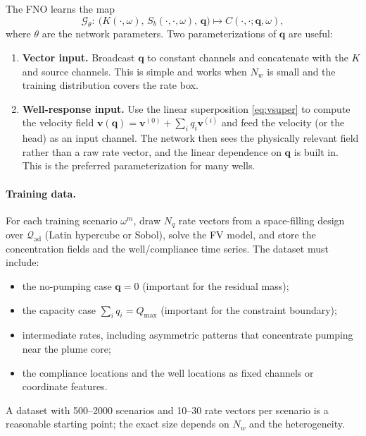 \documentclass[11pt]{article}
\numberwithin{equation}{section}
\newcommand{\vv}{\mathbf{v}}
\theoremstyle{plain}
\begin{document}
The FNO learns the map
\begin{equation}
\label{eq:fno}
\mathcal{G}_\theta:\
\bigl(K(\cdot,\omega),\,S_b(\cdot,\cdot,\omega),\,\mathbf{q}\bigr)
\longmapsto C(\cdot,\cdot;\mathbf{q},\omega),
\end{equation}
where $\theta$ are the network parameters.  Two parameterizations of
$\mathbf{q}$ are useful:
\begin{enumerate}[leftmargin=1.6em,itemsep=2pt]
  \item \textbf{Vector input.}  Broadcast $\mathbf{q}$ to constant channels
        and concatenate with the $K$ and source channels.  This is simple and
        works when $N_w$ is small and the training distribution covers the
        rate box.
  \item \textbf{Well-response input.}  Use the linear superposition
        \eqref{eq:vsuper} to compute the velocity field
        $\vv(\mathbf{q})=\vv^{(0)}+\sum_i q_i\vv^{(i)}$ and feed the velocity
        (or the head) as an input channel.  The network then sees the
        physically relevant field rather than a raw rate vector, and the
        linear dependence on $\mathbf{q}$ is built in.  This is the preferred
        parameterization for many wells.
\end{enumerate}

\paragraph{Training data.}
For each training scenario $\omega^m$, draw $N_q$ rate vectors from a
space-filling design over $\mathcal{Q}_{\mathrm{ad}}$ (Latin hypercube or
Sobol), solve the FV model, and store the concentration fields and the
well/compliance time series.  The dataset must include:
\begin{itemize}[leftmargin=1.6em,itemsep=2pt]
  \item the no-pumping case $\mathbf{q}=0$ (important for the residual mass);
  \item the capacity case $\sum_i q_i=Q_{\max}$ (important for the
        constraint boundary);
  \item intermediate rates, including asymmetric patterns that concentrate
        pumping near the plume core;
  \item the compliance locations and the well locations as fixed channels or
        coordinate features.
\end{itemize}
A dataset with 500--2000 scenarios and 10--30 rate vectors per scenario is a
reasonable starting point; the exact size depends on $N_w$ and the
heterogeneity.
\end{document}
